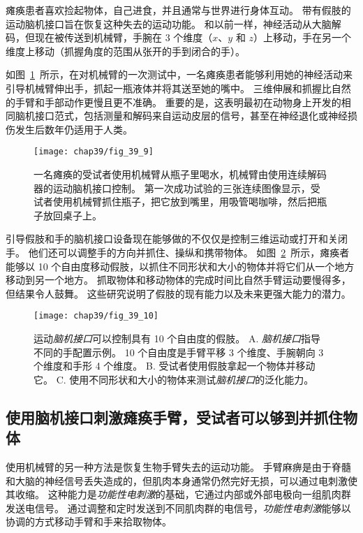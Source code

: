 瘫痪患者喜欢捡起物体，自己进食，并且通常与世界进行身体互动。
带有假肢的运动脑机接口旨在恢复这种失去的运动功能。
和以前一样，神经活动从大脑解码，但现在被传送到机械臂，手腕在 3 个维度（$ x $、$ y $ 和 $ z $）上移动，手在另一个维度上移动（抓握角度的范围从张开的手到闭合的手）。


如图~\ref{fig:39_9}~所示，在对机械臂的一次测试中，一名瘫痪患者能够利用她的神经活动来引导机械臂伸出手，抓起一瓶液体并将其送至她的嘴中。
三维伸展和抓握比自然的手臂和手部动作更慢且更不准确。
重要的是，这表明最初在动物身上开发的相同脑机接口范式，包括测量和解码来自运动皮层的信号，甚至在神经退化或神经损伤发生后数年仍适用于人类。


\begin{figure}[htbp]
	\centering
	\texttt{[image: chap39/fig\_39\_9]}
	\caption{一名瘫痪的受试者使用机械臂从瓶子里喝水，机械臂由使用连续解码器的运动脑机接口控制。 
		第一次成功试验的三张连续图像显示，受试者使用机械臂抓住瓶子，把它放到嘴里，用吸管喝咖啡，然后把瓶子放回桌子上\cite{hochberg2012reach}。}
	\label{fig:39_9}
\end{figure}


引导假肢和手的脑机接口设备现在能够做的不仅仅是控制三维运动或打开和关闭手。
他们还可以调整手的方向并抓住、操纵和携带物体。
如图~\ref{fig:39_10}~所示，瘫痪者能够以 10 个自由度移动假肢，以抓住不同形状和大小的物体并将它们从一个地方移动到另一个地方。
抓取物体和移动物体的完成时间比自然手臂运动要慢得多，但结果令人鼓舞。
这些研究说明了假肢的现有能力以及未来更强大能力的潜力。


\begin{figure}[htbp]
	\centering
	\texttt{[image: chap39/fig\_39\_10]}
	\caption{运动\textit{脑机接口}可以控制具有 10 个自由度的假肢。 
		A. \textit{脑机接口}指导不同的手配置示例。
		10 个自由度是手臂平移 3 个维度、手腕朝向 3 个维度和手形 4 个维度。
		B. 受试者使用假肢拿起一个物体并移动它。
		C. 使用不同形状和大小的物体来测试\textit{脑机接口}的泛化能力\cite{wodlinger2014ten}。}
	\label{fig:39_10}
\end{figure}



\subsection{使用脑机接口刺激瘫痪手臂，受试者可以够到并抓住物体}

使用机械臂的另一种方法是恢复生物手臂失去的运动功能。
手臂麻痹是由于脊髓和大脑的神经信号丢失造成的，但肌肉本身通常仍然完好无损，可以通过电刺激使其收缩。
这种能力是\textit{功能性电刺激}的基础，它通过内部或外部电极向一组肌肉群发送电信号。
通过调整和定时发送到不同肌肉群的电信号，\textit{功能性电刺激}能够以协调的方式移动手臂和手来拾取物体。


